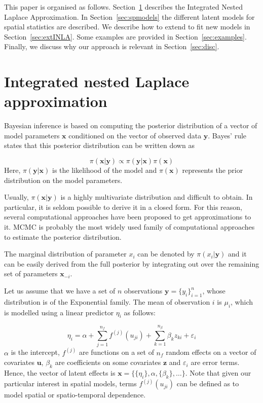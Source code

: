 \documentclass[article]{jss}
\begin{document}
This paper is organised as follows. Section~\ref{sec:INLA} describes the
Integrated Nested Laplace Approximation.  In Section~\ref{sec:spmodels} the
different latent models for spatial statistics are described.  We describe how
to extend  to fit new models in Section~\ref{sec:extINLA}. Some
examples are provided in Section~\ref{sec:examples}.  Finally, we discuss why
our approach is relevant in Section~\ref{sec:disc}.

\section{Integrated nested Laplace approximation}
\label{sec:INLA}

Bayesian inference is based on computing the posterior distribution of a
vector of model parameters $\mathbf{x}$ conditioned on the vector of observed
data $\mathbf{y}$. Bayes' rule states that this posterior distribution
can be written down as

\begin{equation}
\pi(\mathbf{x}|\mathbf{y}) \propto \pi(\mathbf{y}|\mathbf{x}) \pi(\mathbf{x})
\end{equation}
\noindent
Here, $\pi(\mathbf{y}|\mathbf{x})$ is the likelihood of the model and
$\pi(\mathbf{x})$ represents the prior distribution on the model parameters.


Usually, $\pi(\mathbf{x}|\mathbf{y})$ is a highly multivariate distribution
and difficult to obtain. In particular, it is seldom possible to derive it in
a closed form. For this reason, several computational approaches  have been 
proposed to get approximations to it. MCMC is probably the most widely used
family of computational approaches to estimate the posterior distribution.

The marginal distribution of parameter $x_i$ can be denoted by
$\pi(x_i|\mathbf{y})$ and it can be easily derived from the full posterior by
integrating out over the remaining set of parameters $\mathbf{x}_{-i}$.

Let us assume that we have a set of $n$ observations 
$\mathbf{y}=\{y_i\}_ {i=1}^n$, whose distribution is of the Exponential family.
The mean of observation $i$ is $\mu_i$, which is modelled using a linear
predictor $\eta_i$ as follows:

\begin{equation}
\eta_i=\alpha+\sum_{j=1}^{n_f} f^{(j)}(u_{ji})+\sum_{k=1}^{n_{\beta}}\beta_k z_{ki}+\varepsilon_i
\end{equation}
\noindent
$\alpha$ is the intercept, $f^{(j)}$ are functions on a set of $n_f$ random
effects on a vector of covariates $\mathbf{u}$, $\beta_k$ are coefficients on
some covariates $\mathbf{z}$ and $\varepsilon_i$ are error terms. Hence, the
vector of latent effects is $\mathbf{x}=\{\{\eta_i\}, \alpha, \{\beta_k\},
\ldots\}$. Note that given our particular interest in spatial models, terms
$f^{(j)}(u_{ji})$ can be defined as to model spatial or spatio-temporal
dependence.
\end{document}
